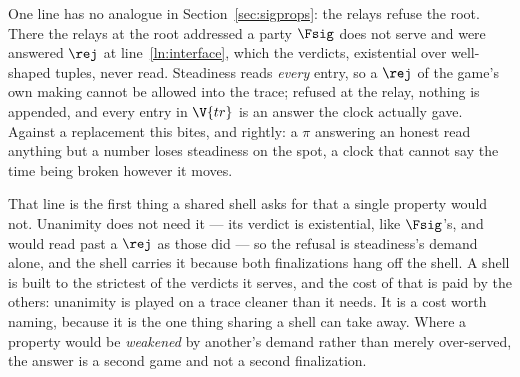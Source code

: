 \documentclass[10pt,oneside,openany]{book}
\theoremstyle{accentdef}
\theoremstyle{accentplain}
\begin{document}
One line has no analogue in Section~\ref{sec:sigprops}: the relays refuse the root. There the
relays at the root addressed a party $\Fsig$ does not serve and were answered $\rej$ at
line~\ref{ln:interface}, which the verdicts, existential over well-shaped tuples, never read.
Steadiness reads \emph{every} entry, so a $\rej$ of the game's own making cannot be allowed into
the trace; refused at the relay, nothing is appended, and every entry in $\V{tr}$ is an answer the
clock actually gave. Against a replacement this bites, and rightly: a $\pi$ answering an honest
read anything but a number loses steadiness on the spot, a clock that cannot say the time being
broken however it moves.

That line is the first thing a shared shell asks for that a single property would not. Unanimity
does not need it --- its verdict is existential, like $\Fsig$'s, and would read past a $\rej$ as
those did --- so the refusal is steadiness's demand alone, and the shell carries it because both
finalizations hang off the shell. A shell is built to the strictest of the verdicts it serves, and
the cost of that is paid by the others: unanimity is played on a trace cleaner than it needs. It
is a cost worth naming, because it is the one thing sharing a shell can take away. Where a
property would be \emph{weakened} by another's demand rather than merely over-served, the answer
is a second game and not a second finalization.
\end{document}

